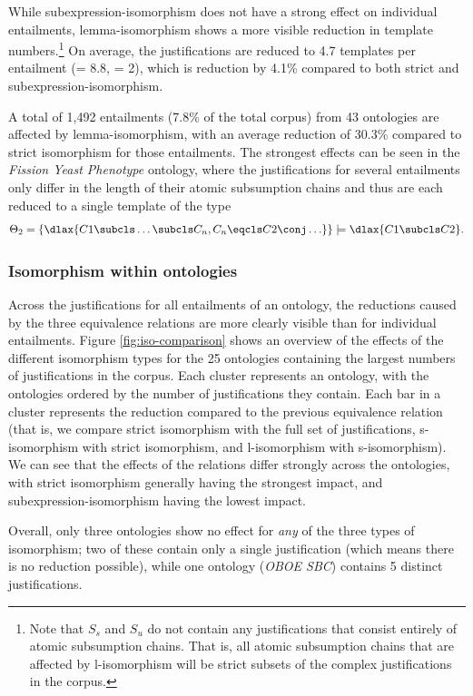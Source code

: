 While subexpression-isomorphism does not have a strong effect on individual entailments, lemma-isomorphism shows a more visible reduction in template numbers.\footnote{Note that $S_{s}$ and $S_{u}$ do not contain any justifications that consist entirely of atomic subsumption chains. That is, all atomic subsumption chains that are affected by l-isomorphism will be strict subsets of the complex justifications in the corpus.} On average, the justifications are reduced to 4.7 templates per entailment (\sdev = 8.8, \median = 2), which is reduction by 4.1\% compared to both strict and subexpression-isomorphism.

A total of 1,492 entailments (7.8\% of the total corpus) from 43 ontologies are affected by lemma-isomorphism, with an average reduction of 30.3\% compared to strict isomorphism for those entailments. The strongest effects can be seen in the \emph{Fission Yeast Phenotype} ontology, where the justifications for several entailments only differ in the length of their atomic subsumption chains and thus are each reduced to a single template of the type \begin{align*}
\Theta_{2} = \{\dlax{C1 \subcls \ldots \subcls C_{n}, C_{n} \eqcls C2 \conj \ldots} \} \models \dlax{C1 \subcls C2}.
\end{align*}


\subsubsection{Isomorphism within ontologies}

Across the justifications for all entailments of an ontology, the reductions caused by the three equivalence relations are more clearly visible than for individual entailments. Figure \ref{fig:iso-comparison} shows an overview of the effects of the different isomorphism types for the 25 ontologies containing the largest numbers of justifications in the corpus. Each cluster represents an ontology, with the ontologies ordered by the number of justifications they contain. Each bar in a cluster represents the reduction compared to the previous equivalence relation (that is, we compare strict isomorphism with the full set of justifications, s-isomorphism with strict isomorphism, and l-isomorphism with s-isomorphism). We can see that the effects of the relations differ strongly across the ontologies, with strict isomorphism generally having the strongest impact, and subexpression-isomorphism having the lowest impact.

Overall, only three ontologies show no effect for \emph{any} of the three types of isomorphism; two of these contain only a single justification (which means there is no reduction possible), while one ontology (\emph{OBOE SBC}) contains 5 distinct justifications.


